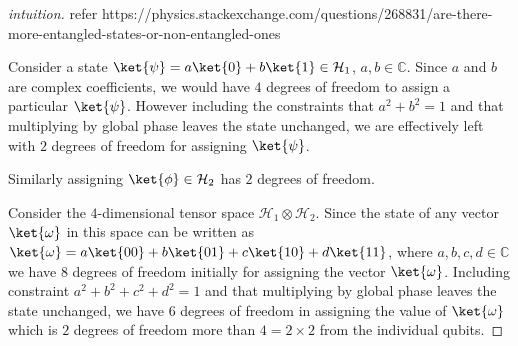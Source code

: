 \begin{proof}[intuition]
    refer https://physics.stackexchange.com/questions/268831/are-there-more-entangled-states-or-non-entangled-ones 

    Consider a state $\ket{\psi} = a \ket{0} + b \ket{1} \in \mathcal{H}_1$, $a,b \in \mathbb{C}$. Since $a$ and $b$ are complex coefficients, we would have $4$ degrees of freedom to assign a particular $\ket{\psi}$. However including the constraints that $a^2 + b^2 = 1$ and that multiplying by global phase leaves the state unchanged, we are effectively left with $2$ degrees of freedom for assigning $\ket{\psi}$. 
    
Similarly assigning $\ket{\phi} \in \mathcal{H}_2$ has $2$ degrees of freedom.

    Consider the $4$-dimensional tensor space $\mathcal{H}_1 \otimes \mathcal{H}_2$. Since the state of any vector $\ket{\omega}$ in this space can be written as $\ket{\omega} = a \ket{00} + b \ket{01} + c \ket{10} + d \ket{11}$, where $a, b, c, d \in \mathbb{C}$ we have $8$ degrees of freedom initially for assigning the vector $\ket{\omega}$. Including constraint $a^2 + b^2 + c^2 + d^2 = 1$ and that multiplying by global phase leaves the state unchanged, we have $6$ degrees of freedom in assigning the value of $\ket{\omega}$ which is $2$ degrees of freedom more than $4 = 2 \times 2$ from the individual qubits.
\end{proof}
